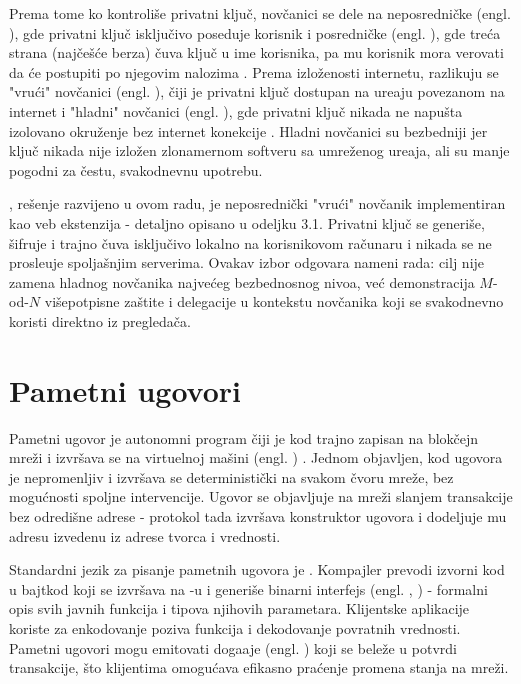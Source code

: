 Prema tome ko kontroli\v se privatni klju\v c, nov\v canici se dele na neposredni\v cke (engl. ), gde privatni klju\v c isklju\v civo poseduje korisnik i posredni\v cke (engl. ), gde tre\' ca strana (naj\v ce\v s\' ce berza) \v cuva klju\v c u ime korisnika, pa mu korisnik mora verovati da \' ce postupiti po njegovim nalozima \cite{antonopoulos2018}. Prema izlo\v zenosti internetu, razlikuju se "vru\' ci" nov\v canici (engl. ), \v ciji je privatni klju\v c dostupan na ure\dj aju povezanom na internet i "hladni" nov\v canici (engl. ), gde privatni klju\v c nikada ne napu\v sta izolovano okru\v zenje bez internet konekcije \cite{antonopoulos2018}. Hladni nov\v canici su bezbedniji jer klju\v c nikada nije izlo\v zen zlonamernom softveru sa umre\v zenog ure\dj aja, ali su manje pogodni za \v cestu, svakodnevnu upotrebu.

, re\v senje razvijeno u ovom radu, je neposredni\v cki "vru\' ci" nov\v canik implementiran kao veb ekstenzija - detaljno opisano u odeljku 3.1. Privatni klju\v c se generi\v se, \v sifruje i trajno \v cuva isklju\v civo lokalno na korisnikovom ra\v cunaru i nikada se ne prosle\dj uje spolja\v snjim serverima. Ovakav izbor odgovara nameni rada: cilj nije zamena hladnog nov\v canika najve\' ceg bezbednosnog nivoa, ve\' c demonstracija $M$-od-$N$ vi\v sepotpisne za\v stite i  delegacije u kontekstu nov\v canika koji se svakodnevno koristi direktno iz pregleda\v ca.

\section{Pametni ugovori}

Pametni ugovor je autonomni program \v ciji je kod trajno zapisan na blok\v cejn mre\v zi i izvr\v sava se na  virtuelnoj ma\v sini (engl. ) \cite{buterin2014,wood2024}. Jednom objavljen, kod ugovora je nepromenljiv i izvr\v sava se deterministi\v cki na svakom \v cvoru mre\v ze, bez mogu\' cnosti spoljne intervencije. Ugovor se objavljuje na mre\v zi slanjem transakcije bez odredi\v sne adrese -  protokol tada izvr\v sava konstruktor ugovora i dodeljuje mu adresu izvedenu iz adrese tvorca i  vrednosti.

Standardni jezik za pisanje pametnih ugovora je  \cite{solidity2024}. Kompajler prevodi izvorni kod u bajtkod koji se izvr\v sava na -u i generi\v se binarni interfejs (engl. , ) \cite{ethabi2024} - formalni opis svih javnih funkcija i tipova njihovih parametara. Klijentske aplikacije koriste  za enkodovanje poziva funkcija i dekodovanje povratnih vrednosti. Pametni ugovori mogu emitovati doga\dj aje (engl. ) koji se bele\v ze u potvrdi transakcije, \v sto klijentima omogu\' cava efikasno pra\' cenje promena stanja na mre\v zi.

